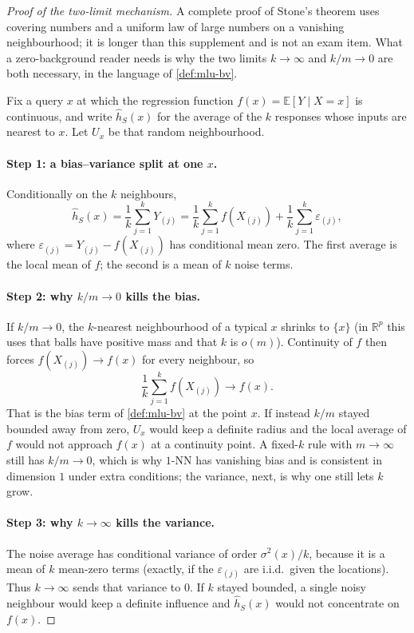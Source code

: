 \begin{proof}[Proof of the two-limit mechanism]
A complete proof of Stone's theorem uses covering numbers and a uniform law of large numbers on a vanishing neighbourhood; it is longer than this supplement and is not an exam item. What a zero-background reader needs is why the two limits $k\to\infty$ and $k/m\to 0$ are both necessary, in the language of \cref{def:mlu-bv}.

Fix a query $x$ at which the regression function $f(x)=\mathbb{E}[Y\mid X=x]$ is continuous, and write $\widehat h_S(x)$ for the average of the $k$ responses whose inputs are nearest to $x$. Let $U_x$ be that random neighbourhood.

\paragraph{Step 1: a bias--variance split at one $x$.}
Conditionally on the $k$ neighbours,
\[
\widehat h_S(x)
=
\frac1k\sum_{j=1}^k Y_{(j)}
=
\frac1k\sum_{j=1}^k f(X_{(j)})
+
\frac1k\sum_{j=1}^k\varepsilon_{(j)},
\]
where $\varepsilon_{(j)}=Y_{(j)}-f(X_{(j)})$ has conditional mean zero. The first average is the local mean of $f$; the second is a mean of $k$ noise terms.

\paragraph{Step 2: why $k/m\to 0$ kills the bias.}
If $k/m\to 0$, the $k$-nearest neighbourhood of a typical $x$ shrinks to $\{x\}$ (in $\mathbb{R}^p$ this uses that balls have positive mass and that $k$ is $o(m)$). Continuity of $f$ then forces $f(X_{(j)})\to f(x)$ for every neighbour, so
\[
\frac1k\sum_{j=1}^k f(X_{(j)})
\to
f(x).
\]
That is the bias term of \cref{def:mlu-bv} at the point $x$. If instead $k/m$ stayed bounded away from zero, $U_x$ would keep a definite radius and the local average of $f$ would not approach $f(x)$ at a continuity point. A fixed-$k$ rule with $m\to\infty$ still has $k/m\to 0$, which is why $1$-NN has vanishing bias and is consistent in dimension $1$ under extra conditions; the variance, next, is why one still lets $k$ grow.

\paragraph{Step 3: why $k\to\infty$ kills the variance.}
The noise average has conditional variance of order $\sigma^2(x)/k$, because it is a mean of $k$ mean-zero terms (exactly, if the $\varepsilon_{(j)}$ are i.i.d.\ given the locations). Thus $k\to\infty$ sends that variance to $0$. If $k$ stayed bounded, a single noisy neighbour would keep a definite influence and $\widehat h_S(x)$ would not concentrate on $f(x)$.


\end{proof}
